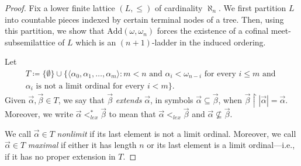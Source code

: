 \documentclass[]{amsart}
\theoremstyle{definition}
\theoremstyle{remark}
\begin{document}
\begin{proof}
Fix a lower finite lattice $(L, \le)$ of cardinality $\aleph_n$. We first partition $L$ into countable pieces indexed by certain terminal nodes of a tree. Then, using this partition, we show that $\text{Add}(\omega, \omega_n)$ forces the existence of a cofinal meet-subsemilattice of $L$ which is an $(n+1)$-ladder in the induced ordering. 

Let
\begin{multline*}
T \coloneqq \big\{\emptyset\} \cup \{\langle\alpha_0, \alpha_1, \dots, \alpha_{m}\rangle : m < n \text{ and } \alpha_i < \omega_{n-i} \text{ for every } i \le m \text{ and } \\ \alpha_i \text{ is not a limit ordinal for every } i < m\big\}.
\end{multline*}
Given $\vec{\alpha}, \vec{\beta} \in T$, we say that $\vec{\beta}$ \emph{extends} $\vec{\alpha}$, in symbols $\vec{\alpha} \subseteq \vec{\beta}$, when $\vec{\beta} \upharpoonright |\vec{\alpha}| = \vec{\alpha}$. Moreover, we write $\vec{\alpha} <_{lex}^* \vec{\beta}$ to mean that $\vec{\alpha} <_{lex} \vec{\beta}$ and $\vec{\alpha} \nsubseteq \vec{\beta}$.

We call $\vec{\alpha} \in T$ \emph{nonlimit} if its last element is not a limit ordinal. Moreover, we call $\vec{\alpha} \in T$ \emph{maximal} if either it has length $n$ or its last element is a limit ordinal---i.e., if it has no proper extension in $T$. 



\end{proof}
\end{document}

